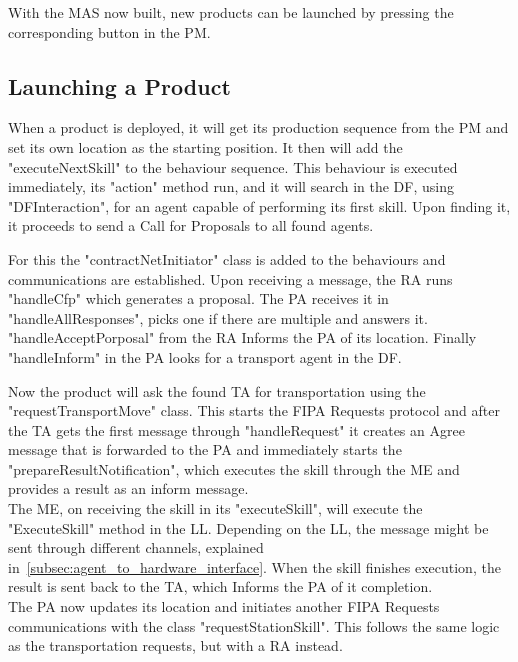 With the \acrshort{MAS} now built, new products can be launched by pressing the corresponding button in the \acrshort{PM}.\\

\subsection{Launching a Product}

When a product is deployed, it will get its production sequence from the \acrshort{PM} and set its own location as the starting position. It then will add the "executeNextSkill" to the behaviour sequence. This behaviour is executed immediately, its "action" method run, and it will search in the \acrshort{DF}, using "DFInteraction", for an agent capable of performing its first skill. Upon finding it, it proceeds to send a Call for Proposals to all found agents.

For this the "contractNetInitiator" class is added to the behaviours and communications are established. Upon receiving a message, the \acrshort{RA} runs "handleCfp" which generates a proposal. The \acrshort{PA} receives it in "handleAllResponses", picks one if there are multiple and answers it. "handleAcceptPorposal" from the \acrshort{RA} Informs the \acrshort{PA} of its location. Finally "handleInform" in the \acrshort{PA} looks for a transport agent in the \acrshort{DF}.

Now the product will ask the found \acrshort{TA} for transportation using the "requestTransportMove" class. This starts the \acrshort{FIPA} Requests protocol and after the \acrshort{TA} gets the first message through "handleRequest" it creates an Agree message that is forwarded to the \acrshort{PA} and immediately starts the "prepareResultNotification", which executes the skill through the \acrshort{ME} and provides a result as an inform message.\\

The \acrlong{ME}, on receiving the skill in its "executeSkill", will execute the "ExecuteSkill" method in the \acrshort{LL}. Depending on the \acrlong{LL}, the message might be sent through different channels, explained in~\ref{subsec:agent_to_hardware_interface}. When the skill finishes execution, the result is sent back to the \acrshort{TA}, which Informs the \acrshort{PA} of it completion.\\

The \acrshort{PA} now updates its location and initiates another \acrshort{FIPA} Requests communications with the class "requestStationSkill". This follows the same logic as the transportation requests, but with a \acrlong{RA} instead.


